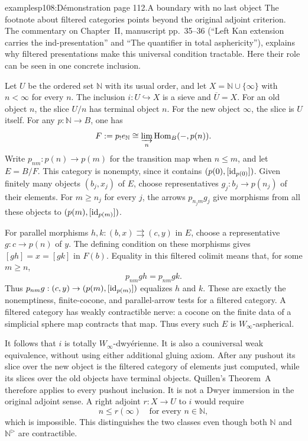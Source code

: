 \begin{dcomment}{examples}{p108:Démonstration page 112.}{A boundary with no last object}
The footnote about filtered categories points beyond the original adjoint criterion. The commentary on Chapter~II, manuscript pp.~35--36 (``Left Kan extension carries the ind-presentation'' and ``The quantifier in total asphericity''), explains why filtered presentations make this universal condition tractable. Here their role can be seen in one concrete inclusion.

Let $U$ be the ordered set $\mathbb N$ with its usual order, and let $X=\mathbb N\cup\{\infty\}$ with $n<\infty$ for every $n$. The inclusion $i:U\hookrightarrow X$ is a sieve and $\overline U=X$. For an old object $n$, the slice $U/n$ has terminal object $n$. For the new object $\infty$, the slice is $U$ itself. For any $p:\mathbb N\to B$, one has
\[
 F:=p_!e_{\mathbb N}\cong\varinjlim_n\mathrm{Hom}_B(-,p(n)).
\]
Write $p_{nm}:p(n)\to p(m)$ for the transition map when $n\leq m$, and let $E=B/F$. This category is nonempty, since it contains $(p(0),[\mathrm{id}_{p(0)}])$. Given finitely many objects $(b_j,x_j)$ of $E$, choose representatives $g_j:b_j\to p(n_j)$ of their elements. For $m\geq n_j$ for every $j$, the arrows $p_{n_jm}g_j$ give morphisms from all these objects to $(p(m),[\mathrm{id}_{p(m)}])$.

For parallel morphisms $h,k:(b,x)\rightrightarrows(c,y)$ in $E$, choose a representative $g:c\to p(n)$ of $y$. The defining condition on these morphisms gives $[gh]=x=[gk]$ in $F(b)$. Equality in this filtered colimit means that, for some $m\geq n$,
\[
 p_{nm}gh=p_{nm}gk.
\]
Thus $p_{nm}g:(c,y)\to(p(m),[\mathrm{id}_{p(m)}])$ equalizes $h$ and $k$. These are exactly the nonemptiness, finite-cocone, and parallel-arrow tests for a filtered category. A filtered category has weakly contractible nerve: a cocone on the finite data of a simplicial sphere map contracts that map. Thus every such $E$ is $W_\infty$-aspherical.

It follows that $i$ is totally $W_\infty$-dwyérienne. It is also a couniversal weak equivalence, without using either additional gluing axiom. After any pushout its slice over the new object is the filtered category of elements just computed, while its slices over the old objects have terminal objects. Quillen's Theorem~A therefore applies to every pushout inclusion. It is not a Dwyer immersion in the original adjoint sense. A right adjoint $r:X\to U$ to $i$ would require
\[
 n\leq r(\infty)\quad\text{for every }n\in\mathbb N,
\]
which is impossible. This distinguishes the two classes even though both $\mathbb N$ and $\mathbb N^\triangleright$ are contractible.


\end{dcomment}
